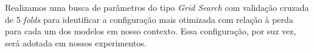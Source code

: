 

Realizamos uma busca de parâmetros do tipo \textit{Grid Search} com validação cruzada de 5 \textit{folds} para identificar a configuração mais otimizada com relação à perda para cada um dos modelos em nosso contexto. Essa configuração, por suz vez, será adotada em nossos experimentos.


